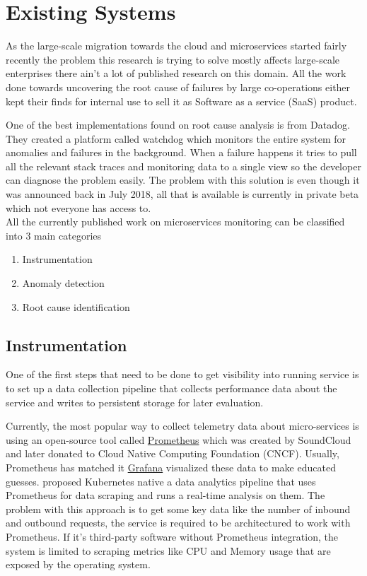 \section{Existing Systems}

As the large-scale migration towards the cloud and microservices started fairly recently the problem this research is trying to solve mostly affects large-scale enterprises there ain't a lot of published research on this domain. All the work done towards uncovering the root cause of failures by large co-operations either kept their finds for internal use to sell it as Software as a service
 (SaaS) product. 

One of the best implementations found on root cause analysis is from Datadog. They created a platform called watchdog \citep{Watchdog76:online} which monitors the entire system for anomalies and failures in the background. When a failure happens it tries to pull all the relevant stack traces and monitoring data to a single view so the developer can diagnose the problem easily. The problem with this solution is even though it was announced back in July 2018, all that is available is currently in private beta which not everyone has access to.
\\
All the currently published work on microservices monitoring can be classified into 3 main categories
\begin{enumerate}
\item Instrumentation
\item Anomaly detection
\item Root cause identification
\end{enumerate}

\subsection{Instrumentation}
One of the first steps that need to be done to get visibility into running service is to set up a data collection pipeline that collects performance data about the service and writes to persistent storage for later evaluation. 

Currently, the most popular way to collect telemetry data about micro-services is using an open-source tool called \href{https://prometheus.io/}{Prometheus} which was created by SoundCloud and later donated to Cloud Native Computing Foundation (CNCF). Usually, Prometheus has matched it \href{https://grafana.com/}{Grafana} visualized these data to make educated guesses. \cite{toka2021predicting} proposed Kubernetes native a data analytics pipeline that uses Prometheus for data scraping and runs a real-time analysis on them. The problem with this approach is to get some key data like the number of inbound and outbound requests, the service is required to be architectured to work with Prometheus. If it's third-party software without Prometheus integration, the system is limited to scraping metrics like CPU and Memory usage that are exposed by the operating system.

